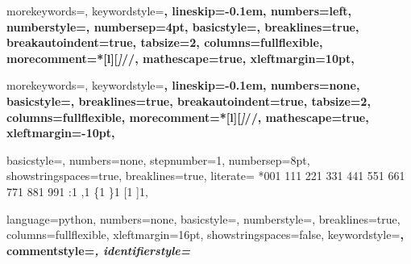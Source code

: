 \makeatletter
\global\let\tikz@ensure@dollar@catcode=\relax
\makeatother


{
  morekeywords={},
  keywordstyle=\bfseries,
  lineskip=-0.1em,
  numbers=left, %
  numberstyle=\jnumberstyle,
  numbersep=4pt,
  basicstyle=\jbasicstyle,
  breaklines=true,
  breakautoindent=true,
  tabsize=2,
  columns=fullflexible,
  morecomment=*[l][\textsl]{//},
  mathescape=true,
  xleftmargin=10pt,
}

{
  morekeywords={},
  keywordstyle=\bfseries,
  lineskip=-0.1em,
  numbers=none,
  basicstyle=\jbasicstyle,
  breaklines=true,
  breakautoindent=true,
  tabsize=2,
  columns=fullflexible,
  morecomment=*[l][\textsl]{//},
  mathescape=true,
  xleftmargin=-10pt,
}

{
  basicstyle=\normalfont\ttfamily,
  numbers=none,
  stepnumber=1,
  numbersep=8pt,
  showstringspaces=true,
  breaklines=true,
  literate=
    *{0}{{{\color{numb}0}}}{1}
     {1}{{{\color{numb}1}}}{1}
     {2}{{{\color{numb}2}}}{1}
     {3}{{{\color{numb}3}}}{1}
     {4}{{{\color{numb}4}}}{1}
     {5}{{{\color{numb}5}}}{1}
     {6}{{{\color{numb}6}}}{1}
     {7}{{{\color{numb}7}}}{1}
     {8}{{{\color{numb}8}}}{1}
     {9}{{{\color{numb}9}}}{1}
     {:}{{{\color{punct}{:}}}}{1}
     {,}{{{\color{punct}{,}}}}{1}
     {\{}{{{\color{delim}{\{}}}}{1}
     {\}}{{{\color{delim}{\}}}}}{1}
     {[}{{{\color{delim}{[}}}}{1}
     {]}{{{\color{delim}{]}}}}{1},
}

{
  language=python,
  numbers=none,
  basicstyle=\jbasicstyle,
  numberstyle=\jnumberstyle,
  breaklines=true,
  columns=fullflexible,
  xleftmargin=16pt,
  showstringspaces=false,
  keywordstyle=\bfseries\color{green!40!black},
  commentstyle=\itshape\color{purple!40!black},
  identifierstyle=\color{blue}
}


\newcommand{\JsonIn}[1]{{\lstinline[language=json-pretty, basicstyle=\small\ttfamily]@#1@}}
\newcommand{\PythonIn}[1]{{\lstinline[language=python-pretty, basicstyle=\small\ttfamily]@#1@}}

